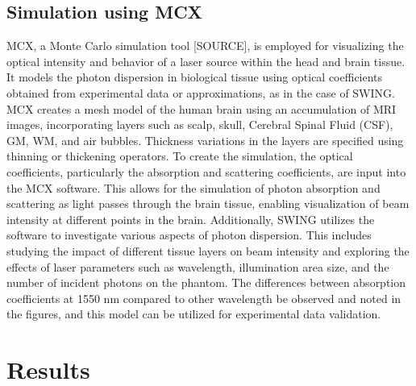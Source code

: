 \documentclass[journal,twoside,web]{ieeecolor}
\begin{document}

\subsection{Simulation using MCX}
MCX, a Monte Carlo simulation tool [SOURCE], is employed for visualizing the optical intensity and behavior of a laser source within the head and brain tissue. 
It models the photon dispersion in biological tissue using optical coefficients obtained from experimental data or approximations, as in the case of SWING. 
MCX creates a mesh model of the human brain using an accumulation of MRI images, incorporating layers such as scalp, skull, Cerebral Spinal Fluid (CSF), GM, WM, 
and air bubbles. Thickness variations in the layers are specified using thinning or thickening operators. To create the simulation, the optical coefficients, particularly the absorption and scattering coefficients, are input into the MCX software. This allows 
for the simulation of photon absorption and scattering as light passes through the brain tissue, enabling visualization of beam intensity at different points in the brain.
Additionally, SWING utilizes the software to investigate various aspects of photon dispersion. This includes studying the impact of different tissue layers 
on beam intensity and exploring the effects of laser parameters such as wavelength, illumination area size, and the number of incident photons on the phantom. 
The differences between absorption coefficients at 1550 nm compared to other wavelength be observed and noted in the figures, and this 
model can be utilized for experimental data validation.

\section{Results}
\label{sec:results}
\end{document}

